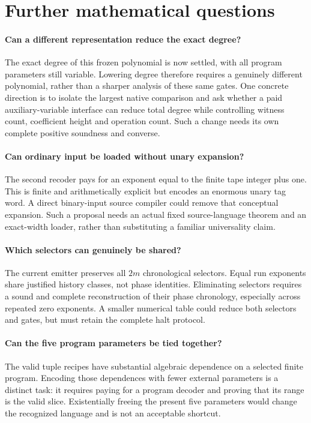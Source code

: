 \documentclass[11pt,letterpaper]{article}
\theoremstyle{definition}\newtheorem{definition}[theorem]{Definition}
\theoremstyle{remark}\newtheorem{remark}[theorem]{Remark}
\begin{document}
\section{Further mathematical questions}
\paragraph{Can a different representation reduce the exact degree?}
The exact degree of this frozen polynomial is now settled, with all program parameters still variable. Lowering degree therefore requires a genuinely different polynomial, rather than a sharper analysis of these same gates. One concrete direction is to isolate the largest native comparison and ask whether a paid auxiliary-variable interface can reduce total degree while controlling witness count, coefficient height and operation count. Such a change needs its own complete positive soundness and converse.

\paragraph{Can ordinary input be loaded without unary expansion?}
The second recoder pays for an exponent equal to the finite tape integer plus one. This is finite and arithmetically explicit but encodes an enormous unary tag word. A direct binary-input source compiler could remove that conceptual expansion. Such a proposal needs an actual fixed source-language theorem and an exact-width loader, rather than substituting a familiar universality claim.

\paragraph{Which selectors can genuinely be shared?}
The current emitter preserves all $2m$ chronological selectors. Equal run exponents share justified history classes, not phase identities. Eliminating selectors requires a sound and complete reconstruction of their phase chronology, especially across repeated zero exponents. A smaller numerical table could reduce both selectors and gates, but must retain the complete halt protocol.

\paragraph{Can the five program parameters be tied together?}
The valid tuple recipes have substantial algebraic dependence on a selected finite program. Encoding those dependences with fewer external parameters is a distinct task: it requires paying for a program decoder and proving that its range is the valid slice. Existentially freeing the present five parameters would change the recognized language and is not an acceptable shortcut.
\end{document}

